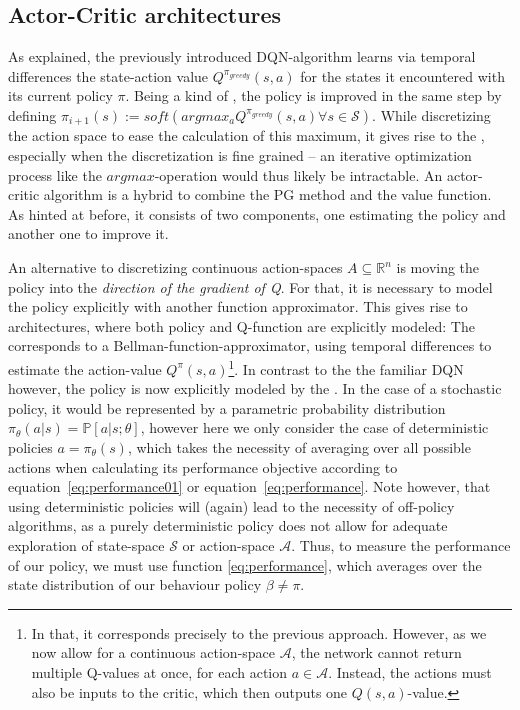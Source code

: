 \subsection{Actor-Critic architectures}

\label{sec:actorcrit}

As explained, the previously introduced DQN-algorithm learns via temporal differences the state-action value $Q^{\pi_{greedy}}(s,a)$ for the states it encountered with its current policy $\pi$. Being a kind of , the policy is improved in the same step by defining $\pi_{i+1}(s) := soft(argmax_a Q^{\pi_{greedy}}(s,a) \forall s \in \mathcal{S})$. While discretizing the action space to ease the calculation of this maximum, it gives rise to the , especially when the discretization is fine grained -- an iterative optimization process like the $argmax$-operation would thus likely be intractable. An actor-critic algorithm is a hybrid to combine the PG method and the value function. As hinted at before, it consists of two components, one estimating the policy and another one to improve it.

\noindent An alternative to discretizing continuous action-spaces \mbox{$A \subseteq \mathds{R}^n$} is moving the policy into the \textit{direction of the gradient of Q}. For that, it is necessary to model the policy explicitly with another function approximator. This gives rise to  architectures, where both policy and Q-function are explicitly modeled: The  corresponds to a Bellman-function-approximator, using temporal differences to estimate the action-value $Q^\pi(s,a)$\footnote{In that, it corresponds precisely to the previous approach. However, as we now allow for a continuous action-space $\mathcal{A}$, the network cannot return multiple Q-values at once, for each action $a \in \mathcal{A}$. Instead, the actions must also be inputs to the critic, which then outputs one $Q(s,a)$-value.}. In contrast to the the familiar DQN however, the policy is now explicitly modeled by the . In the case of a stochastic policy, it would be represented by a parametric probability distribution $\pi_\theta(a|s) = \mathds{P}[a|s;\theta]$, however here we only consider the case of deterministic policies $a = \pi_\theta(s)$, which takes the necessity of averaging over all possible actions when calculating its performance objective according to equation~\ref{eq:performance01} or equation~\ref{eq:performance}. Note however, that using deterministic policies will (again) lead to the necessity of off-policy algorithms, as a purely deterministic policy does not allow for adequate exploration of state-space $\mathcal{S}$ or action-space $\mathcal{A}$. Thus, to measure the performance of our policy, we must use function \ref{eq:performance}, which averages over the state distribution of our behaviour policy $\beta \neq \pi$. 


